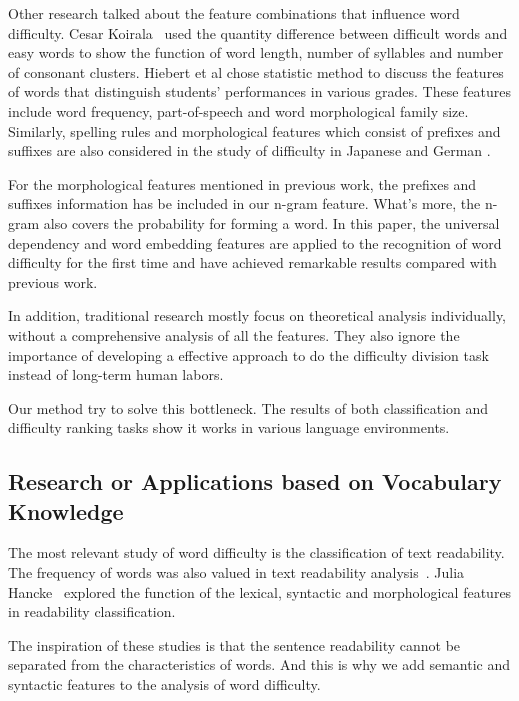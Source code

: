 Other research talked about the feature combinations that influence word difficulty.
Cesar Koirala~ used the quantity difference between difficult words and easy words to show the function of  word length,  number of syllables and  number of consonant clusters.
Hiebert et al  chose statistic method to discuss the features of words that distinguish students’ performances in various grades.
These features include word frequency, part-of-speech and word morphological family size.
Similarly, spelling rules and morphological features which consist of prefixes and suffixes are also considered in the study of difficulty in Japanese and German \cite{hancke2012readability,nakanishi2012estimating}.

For the morphological features mentioned in previous work, the prefixes and suffixes information has be included in our n-gram feature.
What's more, the n-gram also covers the probability for forming a word.
In this paper, the universal dependency and word embedding features are applied to the recognition of word difficulty for the first time and have achieved remarkable results compared with previous work.

In addition, traditional research mostly focus on theoretical analysis individually, without a comprehensive analysis of all the features. 
They also ignore the importance of developing a effective approach to do the difficulty division task instead of long-term human labors.

Our method try to solve this bottleneck.
The results of both classification and difficulty ranking tasks show it works in various language environments.
\subsection{Research or Applications based on Vocabulary Knowledge}
The most relevant study of word difficulty is the classification of text readability.
The frequency of words was also valued in text readability analysis~\cite{chen2016characterizing}.
Julia Hancke~ explored the function of the lexical, syntactic and morphological features in readability classification.

The inspiration of these studies is that the sentence readability cannot be separated from the characteristics of words.
And this is why we add semantic and syntactic features to the analysis of word difficulty.

 